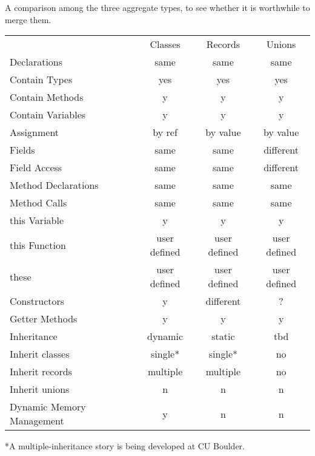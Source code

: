 
A comparison among the three aggregate types, to see whether it is worthwhile to merge them.

\begin{tabular}{lccc}
& Classes & Records & Unions \\
Declarations & same & same & same \\
Contain Types & yes & yes & yes \\
Contain Methods & y & y & y \\
Contain Variables & y & y & y \\
Assignment & by ref & by value & by value \\
Fields & same & same & different \\
Field Access & same & same & different \\
Method Declarations & same & same & same \\
Method Calls & same & same & same \\
this Variable & y & y & y \\
this Function & user defined & user defined & user defined \\
these & user defined & user defined & user defined \\
Constructors & y & different & ? \\
Getter Methods & y & y & y \\
Inheritance & dynamic & static & tbd \\
Inherit classes & single* & single* & no \\
Inherit records & multiple & multiple & no \\
Inherit unions & n & n & n \\
Dynamic Memory Management & y & n & n \\
\end{tabular}
*A multiple-inheritance story is being developed at CU Boulder.


